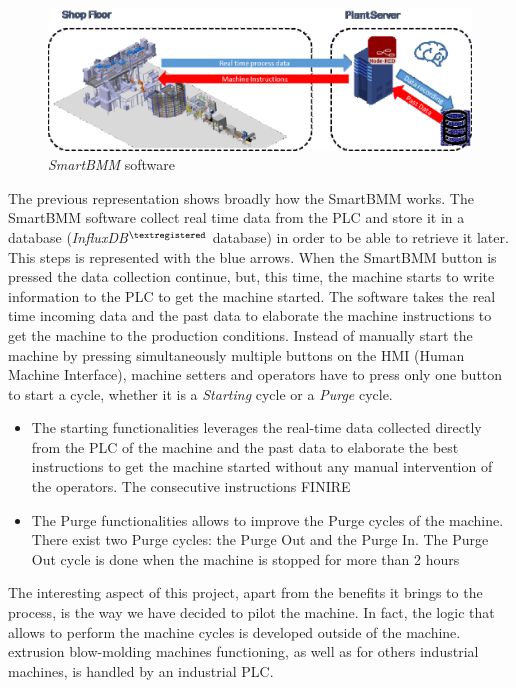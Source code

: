 \begin{figure}
\centerline{\includegraphics[scale=1]{images/chapter_3/SmartBMM.eps}}
\caption{\textit{SmartBMM} software}
\label{fig:SmartBMM}
\end{figure}

The previous representation shows broadly how the SmartBMM works. The SmartBMM software collect real time data from the PLC and store it in a database (\textit{InfluxDB}$^{\tiny{\textregistered}}$ database) in order to be able to retrieve it later. This steps is represented with the blue arrows. When the SmartBMM button is pressed the data collection continue, but, this time, the machine starts to write information to the PLC to get the machine started. The software takes the real time incoming data and the past data to elaborate the machine instructions to get the machine to the production conditions. Instead of manually start the machine by pressing simultaneously multiple buttons on the HMI (Human Machine Interface), machine setters and operators have to press only one button to start a cycle, whether it is a \textit{Starting} cycle or a \textit{Purge} cycle.  

\begin{itemize}
    \item The starting functionalities leverages the real-time data collected directly from the PLC of the machine and the past data to elaborate the best instructions to get the machine started without any manual intervention of the operators. The consecutive instructions FINIRE
    \item The Purge functionalities allows to improve the Purge cycles of the machine. There exist two Purge cycles: the Purge Out and the Purge In. The Purge Out cycle is done when the machine is stopped for more than 2 hours 
\end{itemize}

The interesting aspect of this project, apart from the benefits it brings to the process, is the way we have decided to pilot the machine. In fact, the logic that allows to perform the machine cycles is developed outside of the machine. extrusion blow-molding machines functioning, as well as for others industrial machines, is handled by an industrial PLC. 


